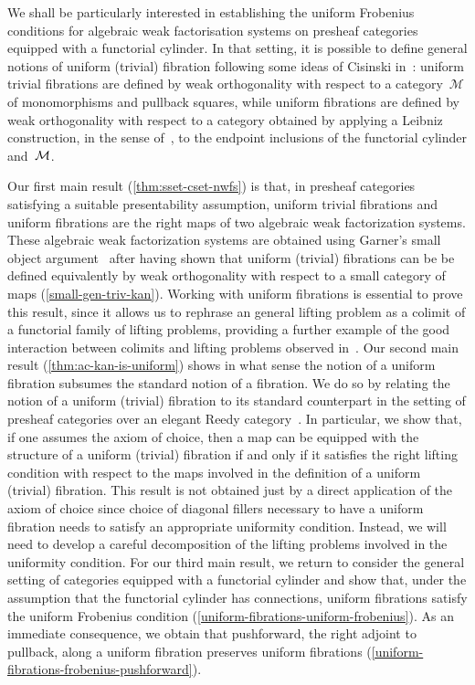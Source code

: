 \documentclass[reqno,10pt,a4paper,oneside,draft]{amsart}
\begin{document}
We shall be particularly interested in establishing the uniform Frobenius conditions
for algebraic weak factorisation systems on presheaf categories equipped with a functorial cylinder. In that setting, it is possible to define general notions of uniform (trivial) fibration
following some ideas of Cisinski in~\cite{cisinski-asterisque}: 
uniform trivial fibrations are defined by weak orthogonality with respect to a category~$\mathcal{M}$ of monomorphisms and pullback squares, while uniform fibrations are defined by weak orthogonality with respect to a category obtained by applying a Leibniz construction, in the sense of~\cite{riehl-verity:reedy}, to the endpoint inclusions of the functorial cylinder and~$\cal{M}$.

Our first main result (\cref{thm:sset-cset-nwfs}) is that, in presheaf categories satisfying a suitable presentability assumption, uniform trivial fibrations and uniform fibrations are the right maps of two algebraic weak factorization systems.
These algebraic weak factorization systems are obtained using Garner's small object argument~\cite{garner:small-object-argument} after having shown that uniform (trivial) fibrations can be be defined equivalently by weak orthogonality with respect to a small category of maps (\cref{small-gen-triv-kan}).
Working with uniform fibrations is essential to prove this result, since it allows us to rephrase an general lifting problem as a colimit of a functorial family of lifting problems, providing
a further example of the good interaction between colimits and lifting problems observed
in~\cite{riehl-cat-homotopy}.
Our second main result (\cref{thm:ac-kan-is-uniform}) shows in what sense the notion of a uniform fibration subsumes the standard notion of a fibration.
We do so by relating the notion of a uniform (trivial) fibration to its standard counterpart in the setting of presheaf categories over an elegant Reedy category~\cite{bergner-rezk-elegant}.
In particular, we show that, if one assumes the axiom of choice, then a map can be equipped with the structure of a uniform (trivial) fibration if and only if it satisfies the right lifting condition with respect to the maps involved in the definition of a uniform (trivial) fibration.
This result is not obtained just by a direct application of the axiom of choice since choice of
diagonal fillers necessary to have a uniform fibration needs to satisfy an appropriate 
uniformity condition.
Instead, we will need to develop a careful decomposition of the lifting problems involved in the uniformity condition.
For our third main result, we return to consider the general setting of categories equipped with a functorial cylinder and show that, under the assumption that the functorial cylinder has connections, uniform fibrations satisfy the uniform Frobenius condition (\cref{uniform-fibrations-uniform-frobenius}). As an immediate consequence, we obtain that pushforward, \ie the right adjoint to pullback, along a uniform fibration preserves uniform fibrations (\cref{uniform-fibrations-frobenius-pushforward}).
\end{document}
